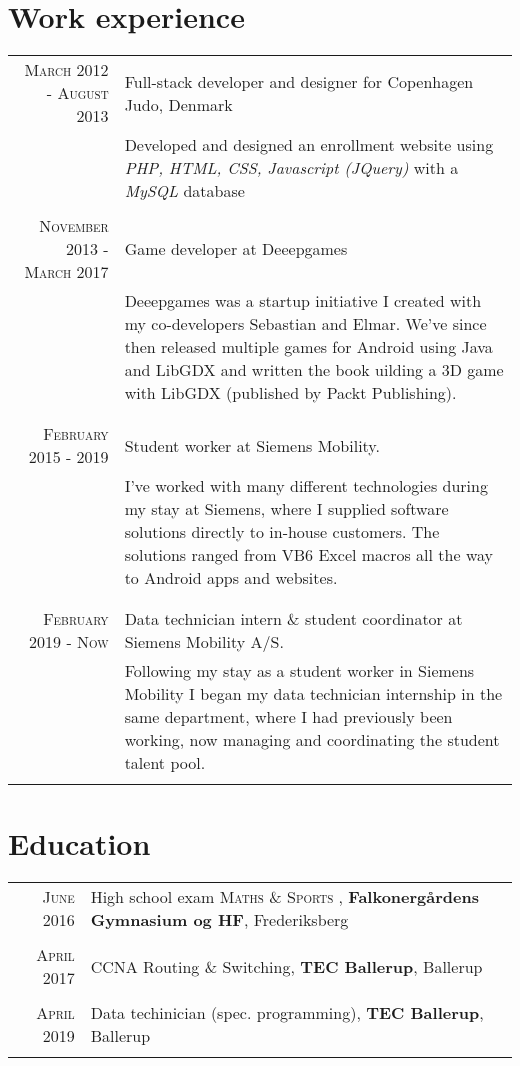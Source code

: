 \documentclass[a4paper,10pt]{article}
\begin{document}
\section{Work experience}
\begin{tabular}{r|p{11cm}}
    \textsc{March 2012 - August 2013} & Full-stack developer and designer for Copenhagen Judo, Denmark \\&\footnotesize{Developed and designed an enrollment website using \textit{PHP, HTML, CSS, Javascript (JQuery)} with a \textit{MySQL} database}\\
    
    \multicolumn{2}{c}{} \\
    \textsc{November 2013 - March 2017} & Game developer at Deeepgames\\&\footnotesize{Deeepgames was a startup initiative I created with my co-developers Sebastian and Elmar. We've since then released multiple games for Android using Java and LibGDX and written the book uilding a 3D game with LibGDX (published by Packt Publishing).}\\\multicolumn{2}{c}{} \\
    
    \multicolumn{2}{c}{} \\
    \textsc{February 2015 - 2019} & Student worker at Siemens Mobility. \\ &\footnotesize{I've worked with many different technologies during my stay at Siemens, where I supplied software solutions directly to in-house customers. The solutions ranged from VB6 Excel macros all the way to Android apps and websites.}\\\multicolumn{2}{c}{} \\
    
    \multicolumn{2}{c}{} \\
    \textsc{February 2019 - Now} & Data technician intern \& student coordinator at Siemens Mobility A/S. \\ &\footnotesize{Following my stay as a student worker in Siemens Mobility I began my data technician internship in the same department, where I had previously been working, now managing and coordinating the student talent pool.}\\\multicolumn{2}{c}{} \\
\end{tabular}

\section{Education}
\begin{tabular}{rl}	
\textsc{June 2016} & High school exam \textsc{Maths \& Sports} , \normalsize\textbf{Falkonergårdens Gymnasium og HF}, Frederiksberg\\
& \\
 \textsc{April} 2017 & CCNA Routing \& Switching, \textbf{TEC Ballerup}, Ballerup\\ & \\
 \textsc{April} 2019 & Data techinician (spec. programming), \textbf{TEC Ballerup}, Ballerup\\ & \\
\end{tabular}
\end{document}
